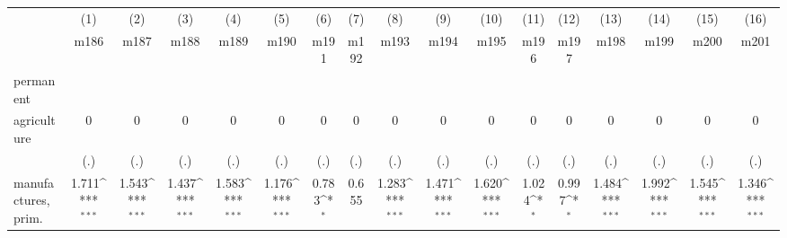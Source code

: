 {
\def\sym#1{\ifmmode^{#1}\else\(^{#1}\)\fi}
\begin{tabular}{l*{16}{c}}
\hline\hline
                    &\multicolumn{1}{c}{(1)}&\multicolumn{1}{c}{(2)}&\multicolumn{1}{c}{(3)}&\multicolumn{1}{c}{(4)}&\multicolumn{1}{c}{(5)}&\multicolumn{1}{c}{(6)}&\multicolumn{1}{c}{(7)}&\multicolumn{1}{c}{(8)}&\multicolumn{1}{c}{(9)}&\multicolumn{1}{c}{(10)}&\multicolumn{1}{c}{(11)}&\multicolumn{1}{c}{(12)}&\multicolumn{1}{c}{(13)}&\multicolumn{1}{c}{(14)}&\multicolumn{1}{c}{(15)}&\multicolumn{1}{c}{(16)}\\
                    &\multicolumn{1}{c}{m186}&\multicolumn{1}{c}{m187}&\multicolumn{1}{c}{m188}&\multicolumn{1}{c}{m189}&\multicolumn{1}{c}{m190}&\multicolumn{1}{c}{m191}&\multicolumn{1}{c}{m192}&\multicolumn{1}{c}{m193}&\multicolumn{1}{c}{m194}&\multicolumn{1}{c}{m195}&\multicolumn{1}{c}{m196}&\multicolumn{1}{c}{m197}&\multicolumn{1}{c}{m198}&\multicolumn{1}{c}{m199}&\multicolumn{1}{c}{m200}&\multicolumn{1}{c}{m201}\\
\hline
permanent           &                     &                     &                     &                     &                     &                     &                     &                     &                     &                     &                     &                     &                     &                     &                     &                     \\
agriculture         &           0         &           0         &           0         &           0         &           0         &           0         &           0         &           0         &           0         &           0         &           0         &           0         &           0         &           0         &           0         &           0         \\
                    &         (.)         &         (.)         &         (.)         &         (.)         &         (.)         &         (.)         &         (.)         &         (.)         &         (.)         &         (.)         &         (.)         &         (.)         &         (.)         &         (.)         &         (.)         &         (.)         \\
[1em]
manufactures, prim. &       1.711\sym{***}&       1.543\sym{***}&       1.437\sym{***}&       1.583\sym{***}&       1.176\sym{***}&       0.783\sym{*}  &       0.655         &       1.283\sym{***}&       1.471\sym{***}&       1.620\sym{***}&       1.024\sym{*}  &       0.997\sym{*}  &       1.484\sym{***}&       1.992\sym{***}&       1.545\sym{***}&       1.346\sym{***}\\

\end{tabular}}
